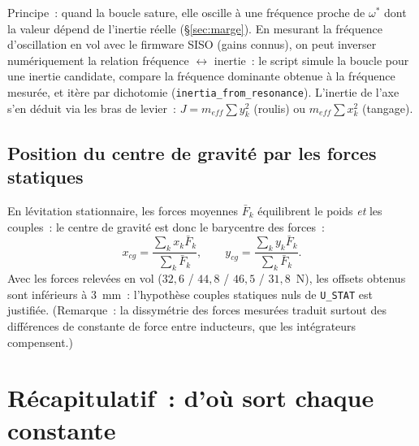\documentclass[a4paper,11pt]{article}
\begin{document}
Principe~: quand la boucle sature, elle oscille à une fréquence proche de
$\omega^{*}$ dont la valeur dépend de l'inertie réelle (§\ref{sec:marge}). En
mesurant la fréquence d'oscillation en vol avec le firmware SISO (gains
connus), on peut inverser numériquement la relation fréquence
$\leftrightarrow$ inertie~: le script simule la boucle pour une inertie
candidate, compare la fréquence dominante obtenue à la fréquence mesurée, et
itère par dichotomie (\texttt{inertia\_from\_resonance}). L'inertie de l'axe
s'en déduit via les bras de levier~: $J = m_{eff}\sum y_k^2$ (roulis) ou
$m_{eff}\sum x_k^2$ (tangage).

\subsection{Position du centre de gravité par les forces statiques}
\label{subsec:identcg}

En lévitation stationnaire, les forces moyennes $\bar F_k$ équilibrent le
poids \emph{et} les couples~: le centre de gravité est donc le barycentre des
forces~:
\begin{equation}
    x_{cg} = \frac{\sum_k x_k \bar F_k}{\sum_k \bar F_k},
    \qquad
    y_{cg} = \frac{\sum_k y_k \bar F_k}{\sum_k \bar F_k}.
\end{equation}
Avec les forces relevées en vol ($32{,}6$ / $44{,}8$ / $46{,}5$ / $31{,}8$~N),
les offsets obtenus sont inférieurs à 3~mm~: l'hypothèse \og couples statiques
nuls \fg{} de \texttt{U\_STAT} est justifiée. (Remarque~: la dissymétrie des
forces mesurées traduit surtout des différences de constante de force entre
inducteurs, que les intégrateurs compensent.)

\section{Récapitulatif~: d'où sort chaque constante}
\end{document}
